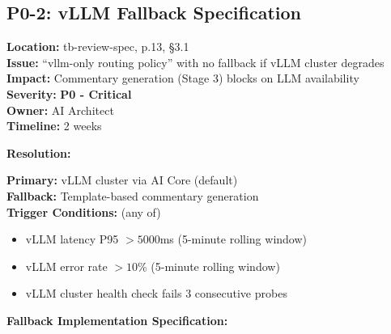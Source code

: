 \subsection{P0-2: vLLM Fallback Specification}
\label{sec:p0-vllm-fallback}

\begin{tcolorbox}[colback=red!5,colframe=red!70,title=\faIcon{exclamation-triangle} Finding P0-2: vLLM Fallback Not Specified]
\textbf{Location:} tb-review-spec, p.13, \S3.1\\
\textbf{Issue:} ``vllm-only routing policy'' with no fallback if vLLM cluster degrades\\
\textbf{Impact:} Commentary generation (Stage 3) blocks on LLM availability\\
\textbf{Severity:} \textbf{P0 - Critical}\\
\textbf{Owner:} AI Architect\\
\textbf{Timeline:} 2 weeks
\end{tcolorbox}

\textbf{Resolution:}

\begin{tcolorbox}[colback=green!5,colframe=green!70,title=\faIcon{check-circle} Resolution: Graceful Degradation Specification]
\textbf{Primary:} vLLM cluster via AI Core (default)\\
\textbf{Fallback:} Template-based commentary generation\\
\textbf{Trigger Conditions:} (any of)
\begin{itemize}
    \item vLLM latency P95 $> 5000$ms (5-minute rolling window)
    \item vLLM error rate $> 10\%$ (5-minute rolling window)
    \item vLLM cluster health check fails 3 consecutive probes
\end{itemize}
\end{tcolorbox}

\textbf{Fallback Implementation Specification:}

